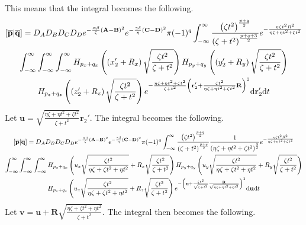 This means that the integral becomes the following.
\begin{multline}
  \left[\overline{\mathbf{p}}\middle|\overline{\mathbf{q}}\right] = D_A D_B D_C D_D e^{-\frac{\alpha\beta}{\zeta}\left(\mathbf{A} - \mathbf{B}\right)^2}e^{-\frac{\gamma\delta}{\eta}\left(\mathbf{C} - \mathbf{D}\right)^2}\pi (-1)^{q} \int_{-\infty}^\infty \frac{\left(\zeta t^2\right)^{\frac{p + q}{2}}}{\left(\zeta + t^2\right)^{\frac{p + q + 3}{2}}} e^{-\frac{\eta\zeta t^2 R^2}{\eta\zeta + \eta t^2 + \zeta t^2}}\\
  \int_{-\infty}^\infty\int_{-\infty}^\infty\int_{-\infty}^\infty H_{p_x + q_x}\left(\left(x_2' + R_x\right)\sqrt{\frac{\zeta t^2}{\zeta + t^2}}\right)H_{p_y + q_y}\left(\left(y_2' + R_y\right)\sqrt{\frac{\zeta t^2}{\zeta + t^2}}\right)\\
  H_{p_z + q_z}\left(\left(z_2' + R_z\right)\sqrt{\frac{\zeta t^2}{\zeta + t^2}}\right)e^{-\frac{\eta\zeta + \eta t^2 + \zeta t^2}{\zeta + t^2}\left(\mathbf{r}_2' + \frac{\zeta t^2}{\eta\zeta + \eta t^2 + \zeta t^2} \mathbf{R}\right)^2} \mathrm{d}\mathbf{r}_2' \mathrm{d} t
\end{multline}
Let $\mathbf{u} = \sqrt{\frac{\eta\zeta + \eta t^2 + \zeta t^2}{\zeta + t^2}}\mathbf{r}_2'$. The integral becomes the following.
\begin{multline}
  \left[\overline{\mathbf{p}}\middle|\overline{\mathbf{q}}\right] = D_A D_B D_C D_D e^{-\frac{\alpha\beta}{\zeta}\left(\mathbf{A} - \mathbf{B}\right)^2}e^{-\frac{\gamma\delta}{\eta}\left(\mathbf{C} - \mathbf{D}\right)^2}\pi (-1)^{q} \int_{-\infty}^\infty \frac{\left(\zeta t^2\right)^{\frac{p + q}{2}}}{\left(\zeta + t^2\right)^{\frac{p + q}{2}}}\frac{1}{\left(\eta \zeta + \eta t^2 + \zeta t^2\right)^{\frac{3}{2}}} e^{-\frac{\eta\zeta t^2 R^2}{\eta\zeta + \eta t^2 + \zeta t^2}}\\
  \int_{-\infty}^\infty\int_{-\infty}^\infty\int_{-\infty}^\infty H_{p_x + q_x}\left(u_x\sqrt{\frac{\zeta t^2}{\eta\zeta + \zeta t^2 + \eta t^2}} + R_x\sqrt{\frac{\zeta t^2}{\zeta + t^2}}\right)H_{p_y + q_y}\left(u_y\sqrt{\frac{\zeta t^2}{\eta\zeta + \zeta t^2 + \eta t^2}} + R_y\sqrt{\frac{\zeta t^2}{\zeta + t^2}}\right)\\
  H_{p_z + q_z}\left(u_z\sqrt{\frac{\zeta t^2}{\eta\zeta + \zeta t^2 + \eta t^2}} + R_z\sqrt{\frac{\zeta t^2}{\zeta + t^2}}\right) e^{-\left(\mathbf{u} + \frac{\zeta t^2}{\sqrt{\zeta + t^2}}\frac{\mathbf{R}}{\sqrt{\eta\zeta + \eta t^2 + \zeta t^2}}\right)^2} \mathrm{d}\mathbf{u}\mathrm{d} t
\end{multline}
Let $\mathbf{v} = \mathbf{u} + \mathbf{R} \sqrt{\frac{\eta\zeta + \zeta t^2 + \eta t^2}{\zeta + t^2}}$. The integral then becomes the following.
